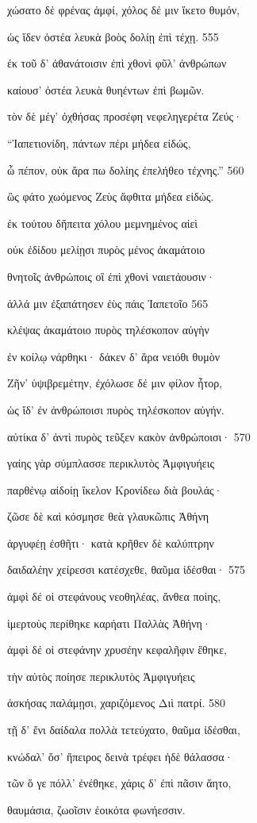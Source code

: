 χώσατο δὲ φρένας ἀμφί, χόλος δέ μιν ἵκετο θυμόν,

ὡς ἴδεν ὀστέα λευκὰ βοὸς δολίῃ ἐπὶ τέχῃ. 555

ἐκ τοῦ δ' ἀθανάτοισιν ἐπὶ χθονὶ φῦλ' ἀνθρώπων

καίουσ' ὀστέα λευκὰ θυηέντων ἐπὶ βωμῶν. 

τὸν δὲ μέγ' ὀχθήσας προσέφη νεφεληγερέτα Ζεύς· 

``Ἰαπετιονίδη, πάντων πέρι μήδεα εἰδώς, 

ὦ πέπον, οὐκ ἄρα πω δολίης ἐπελήθεο τέχνης.'' 560 

ὣς φάτο χωόμενος Ζεὺς ἄφθιτα μήδεα εἰδώς. 

ἐκ τούτου δἤπειτα χόλου μεμνημένος αἰεὶ 

οὐκ ἐδίδου μελίῃσι πυρὸς μένος ἀκαμάτοιο

θνητοῖς ἀνθρώποις οἳ ἐπὶ χθονὶ ναιετάουσιν· 

ἀλλά μιν ἐξαπάτησεν ἐὺς πάις Ἰαπετοῖο 565

κλέψας ἀκαμάτοιο πυρὸς τηλέσκοπον αὐγὴν

ἐν κοίλῳ νάρθηκι· δάκεν δ' ἄρα νειόθι θυμὸν

Ζῆν' ὑψιβρεμέτην, ἐχόλωσε δέ μιν φίλον ἦτορ,

ὡς ἴδ' ἐν ἀνθρώποισι πυρὸς τηλέσκοπον αὐγήν.

αὐτίκα δ' ἀντὶ πυρὸς τεῦξεν κακὸν ἀνθρώποισι· 570 

γαίης γὰρ σύμπλασσε περικλυτὸς Ἀμφιγυήεις

παρθένῳ αἰδοίῃ ἴκελον Κρονίδεω διὰ βουλάς· 

ζῶσε δὲ καὶ κόσμησε θεὰ γλαυκῶπις Ἀθήνη

ἀργυφέῃ ἐσθῆτι· κατὰ κρῆθεν δὲ καλύπτρην 

δαιδαλέην χείρεσσι κατέσχεθε, θαῦμα ἰδέσθαι· 575 

ἀμφὶ δέ οἱ στεφάνους νεοθηλέας, ἄνθεα ποίης,

ἱμερτοὺς περίθηκε καρήατι Παλλὰς Ἀθήνη· 

ἀμφὶ δέ οἱ στεφάνην χρυσέην κεφαλῆφιν ἔθηκε,

τὴν αὐτὸς ποίησε περικλυτὸς Ἀμφιγυήεις

ἀσκήσας παλάμῃσι, χαριζόμενος Διὶ πατρί. 580

τῇ δ' ἔνι δαίδαλα πολλὰ τετεύχατο, θαῦμα ἰδέσθαι,

κνώδαλ' ὅσ' ἤπειρος δεινὰ τρέφει ἠδὲ θάλασσα·

τῶν ὅ γε πόλλ' ἐνέθηκε, χάρις δ' ἐπὶ πᾶσιν ἄητο,

θαυμάσια, ζωοῖσιν ἐοικότα φωνήεσσιν.

